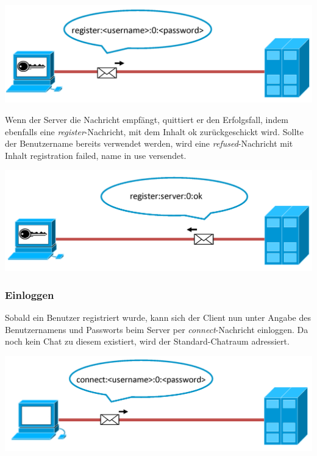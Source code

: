 \documentclass[12pt,a4paper,bibliography=totocnumbered,listof=totocnumbered]{scrartcl}
\begin{document}
\vspace{1em}
\begin{minipage}{\linewidth}
	\centering
	\includegraphics[width=0.7\linewidth]{img/register1.png}
	\label{fig:Registrierung1}
\end{minipage}
\vspace{0.5em}

Wenn der Server die Nachricht empfängt, quittiert er den Erfolgsfall, indem ebenfalls eine  \textit{register}-Nachricht, mit dem Inhalt \glqq ok\grqq{} zurückgeschickt wird. Sollte der Benutzername bereits verwendet werden, wird eine \textit{refused}-Nachricht mit Inhalt \glqq registration failed, name in use\grqq{} versendet.

\vspace{1em}
\begin{minipage}{\linewidth}
	\centering
	\includegraphics[width=0.7\linewidth]{img/register2.png}
	\label{fig:Registrierung2}
\end{minipage}
\vspace{0.5em}

\subsubsection{Einloggen}
Sobald ein Benutzer registriert wurde, kann sich der Client nun unter Angabe des Benutzernamens und Passworts beim Server per \textit{connect}-Nachricht einloggen. Da noch kein Chat zu diesem existiert, wird der Standard-Chatraum adressiert.

\vspace{1em}
\begin{minipage}{\linewidth}
	\centering
	\includegraphics[width=0.7\linewidth]{img/connect1.png}
	\label{fig:connect1}
\end{minipage}
\vspace{0.5em} 
\end{document}
